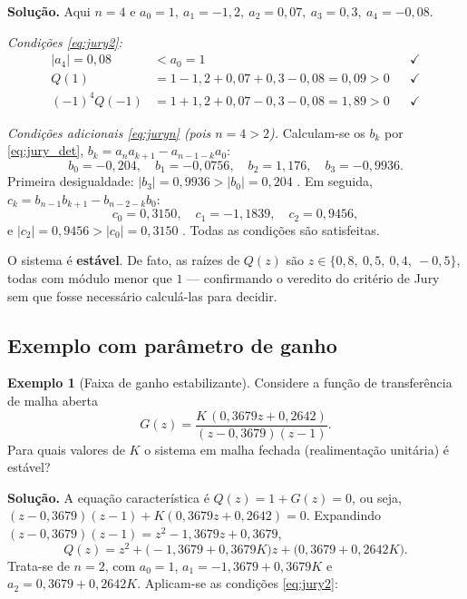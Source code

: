 \documentclass[11pt,a4paper,oneside]{book}
\theoremstyle{definition}
\newtheorem{exemplo}{Exemplo}[chapter]
\theoremstyle{plain}
\begin{document}
\noindent\textbf{Solução.} Aqui $n=4$ e
$a_0=1,\ a_1=-1{,}2,\ a_2=0{,}07,\ a_3=0{,}3,\ a_4=-0{,}08$.

\emph{Condições \eqref{eq:jury2}:}
\begin{align*}
|a_4|=0{,}08&<a_0=1 &&\checkmark\\
Q(1)&=1-1{,}2+0{,}07+0{,}3-0{,}08=0{,}09>0 &&\checkmark\\
(-1)^4Q(-1)&=1+1{,}2+0{,}07-0{,}3-0{,}08=1{,}89>0 &&\checkmark
\end{align*}

\emph{Condições adicionais \eqref{eq:juryn} (pois $n=4>2$).} Calculam-se os
$b_k$ por \eqref{eq:jury_det}, $b_k=a_n a_{k+1}-a_{n-1-k}a_0$:
\[
b_0=-0{,}204,\quad b_1=-0{,}0756,\quad b_2=1{,}176,\quad b_3=-0{,}9936.
\]
Primeira desigualdade: $|b_3|=0{,}9936>|b_0|=0{,}204$ \checkmark. Em seguida,
$c_k=b_{n-1}b_{k+1}-b_{n-2-k}b_0$:
\[
c_0=0{,}3150,\quad c_1=-1{,}1839,\quad c_2=0{,}9456,
\]
e $|c_2|=0{,}9456>|c_0|=0{,}3150$ \checkmark. Todas as condições são satisfeitas.

\begin{destaque}
O sistema é \textbf{estável}. De fato, as raízes de $Q(z)$ são
$z\in\{0{,}8,\ 0{,}5,\ 0{,}4,\ -0{,}5\}$, todas com módulo menor que $1$ ---
confirmando o veredito do critério de Jury sem que fosse necessário calculá-las
para decidir.
\end{destaque}

\subsection{Exemplo com parâmetro de ganho}

\begin{exemplo}[Faixa de ganho estabilizante]
\label{ex:jury2}
Considere a função de transferência de malha aberta
\begin{equation}
    G(z)=\frac{K\,(0{,}3679z+0{,}2642)}{(z-0{,}3679)(z-1)}.
\end{equation}
Para quais valores de $K$ o sistema em malha fechada (realimentação unitária) é
estável?
\end{exemplo}

\noindent\textbf{Solução.} A equação característica é $Q(z)=1+G(z)=0$, ou seja,
$(z-0{,}3679)(z-1)+K(0{,}3679z+0{,}2642)=0$. Expandindo $(z-0{,}3679)(z-1)=
z^2-1{,}3679z+0{,}3679$,
\[
Q(z)=z^2+\big(-1{,}3679+0{,}3679K\big)z+\big(0{,}3679+0{,}2642K\big).
\]
Trata-se de $n=2$, com $a_0=1$, $a_1=-1{,}3679+0{,}3679K$ e
$a_2=0{,}3679+0{,}2642K$. Aplicam-se as condições \eqref{eq:jury2}:
\end{document}
